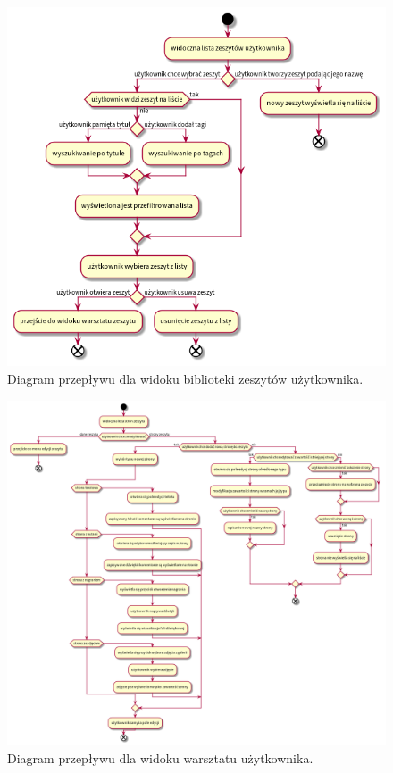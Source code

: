 \begin{figure}[H]
	\begin{center}
		\includegraphics[scale=0.5]{media/UserFlowLibrary.png}
	\end{center}
	\caption{Diagram przepływu dla widoku biblioteki zeszytów użytkownika.}
	\label{rys:flow-library}
\end{figure}
\begin{figure}[H]
	\begin{center}
		\includegraphics[scale=0.36]{media/UserFlowWorkshop.png}
	\end{center}
	\caption{Diagram przepływu dla widoku warsztatu użytkownika.}
	\label{rys:flow-workshop}
\end{figure}
